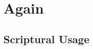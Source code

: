 \section{Again}
	\label{AGAIN}
	





\subsection{Scriptural Usage} %
	\label{AGAIN-SCRIPTURES}

	
	
